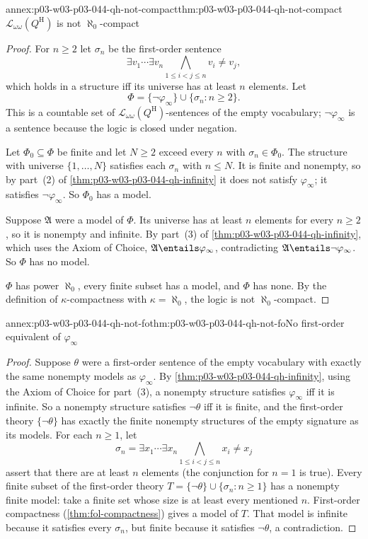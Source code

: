\begin{annexitem}{annex:p03-w03-p03-044-qh-not-compact}{thm:p03-w03-p03-044-qh-not-compact}{\(\mathscr L_{\omega\omega}(Q^{\mathrm H})\) is not \(\aleph_0\)-compact}
\begin{proof}
For \(n\ge2\) let \(\sigma_n\) be the first-order sentence
\[
 \exists v_1\cdots\exists v_n\bigwedge_{1\le i<j\le n}v_i\neq v_j,
\]
which holds in a structure iff its universe has at least \(n\) elements.
Let
\[
 \Phi=\{\neg\varphi_\infty\}\cup\{\sigma_n:n\ge2\}.
\]
This is a countable set of \(\mathscr L_{\omega\omega}(Q^{\mathrm H})\)-sentences
of the empty vocabulary; \(\neg\varphi_\infty\) is a sentence because the
logic is closed under negation.

Let \(\Phi_0\subseteq\Phi\) be finite and let \(N\ge2\) exceed every \(n\)
with \(\sigma_n\in\Phi_0\).  The structure with universe
\(\{1,\ldots,N\}\) satisfies each \(\sigma_n\) with \(n\le N\).  It is
finite and nonempty, so by part~(2) of
\cref{thm:p03-w03-p03-044-qh-infinity} it does not satisfy
\(\varphi_\infty\); it satisfies \(\neg\varphi_\infty\).  So \(\Phi_0\) has a
model.

Suppose \(\mathfrak A\) were a model of \(\Phi\).  Its universe has at least
\(n\) elements for every \(n\ge2\), so it is nonempty and infinite.  By
part~(3) of \cref{thm:p03-w03-p03-044-qh-infinity}, which uses the Axiom of
Choice, \(\mathfrak A\entails\varphi_\infty\), contradicting
\(\mathfrak A\entails\neg\varphi_\infty\).  So \(\Phi\) has no model.

\(\Phi\) has power \(\aleph_0\), every finite subset has a model, and
\(\Phi\) has none.  By the definition of \(\kappa\)-compactness with
\(\kappa=\aleph_0\), the logic is not \(\aleph_0\)-compact.
\end{proof}
\end{annexitem}

\begin{annexitem}{annex:p03-w03-p03-044-qh-not-fo}{thm:p03-w03-p03-044-qh-not-fo}{No first-order equivalent of \(\varphi_\infty\)}
\begin{proof}
Suppose \(\theta\) were a first-order sentence of the empty vocabulary with
exactly the same nonempty models as \(\varphi_\infty\).  By
\cref{thm:p03-w03-p03-044-qh-infinity}, using the Axiom of Choice for
part~(3), a nonempty structure satisfies \(\varphi_\infty\) iff it is
infinite.  So a nonempty structure satisfies \(\neg\theta\) iff it is
finite, and the first-order theory \(\{\neg\theta\}\) has exactly the finite
nonempty structures of the empty signature as its models. For each
\(n\geq1\), let
\[
 \sigma_n=\exists x_1\cdots\exists x_n
             \bigwedge_{1\leq i<j\leq n}x_i\neq x_j
\]
assert that there are at least \(n\) elements (the conjunction for
\(n=1\) is true). Every finite subset of the first-order theory
\(T=\{\neg\theta\}\cup\{\sigma_n:n\geq1\}\) has a nonempty finite
model: take a finite set whose size is at least every mentioned \(n\).
First-order compactness (\cref{thm:fol-compactness}) gives a model of
\(T\). That model is infinite because it satisfies every \(\sigma_n\),
but finite because it satisfies \(\neg\theta\), a contradiction.
\end{proof}
\end{annexitem}

